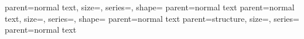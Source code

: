 


	{parent=normal text, size=\large, series=\mdseries, shape=\upshape}
	{parent=normal text}
	{parent=normal text, size=\small, series=\mdseries, shape=\itshape}
	{parent=normal text}
	{parent=structure, size=\normalsize, series=\bfseries}
	{parent=normal text}

\makeatletter
{}
\makeatother

\makeatletter
\renewcommand{\beamer@insttitle}[1]{\highlight{\textsuperscript{\kern.75pt \textit{#1}}}}
\renewcommand{\beamer@instinst}[1]{\beamer@insttitle{#1}\ignorespaces}
\renewcommand{\beamer@andinst}{\\[0.33\baselineskip]}
\makeatother






